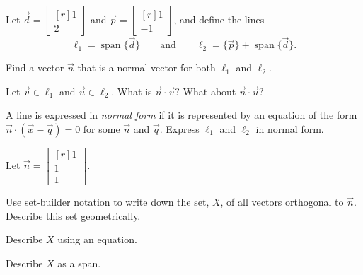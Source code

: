 \documentclass{problemset}
\DeclareMathOperator{\Span}{span}
\newcommand{\mat}[1]{\begin{bmatrix*}[r]#1\end{bmatrix*}}
\begin{document}
	\question
	Let $\vec d=\mat{1\\2}$ and $\vec p=\mat{1\\-1}$, and define the lines
	\[
		\ell_1 = \Span\{\vec d\}\qquad\text{and}\qquad \ell_2=\{\vec p\}+\Span\{\vec d\}.
	\]
	\begin{parts}
		\item Find a vector $\vec n$ that is a normal vector for both $\ell_1$ and
			$\ell_2$.
		\item Let $\vec v\in \ell_1$ and $\vec u\in \ell_2$.
			What is $\vec n\cdot \vec v$? What about $\vec n\cdot \vec u$?
		\item A line is expressed in \emph{normal form} if it is represented by an
			equation of the form $\vec n\cdot (\vec x-\vec q)=0$ for some $\vec n$ and 
			$\vec q$. Express $\ell_1$ and $\ell_2$ in normal form.
	\end{parts}
	
	\question
	Let $\vec n=\mat{1\\1\\1}$.
	\begin{parts}
		\item Use set-builder notation to write down the set, $X$, of
			all vectors orthogonal to $\vec n$. Describe this set
			geometrically.
		\item Describe $X$ using an equation.
		\item Describe $X$ as a span.
	\end{parts}
\end{document}
